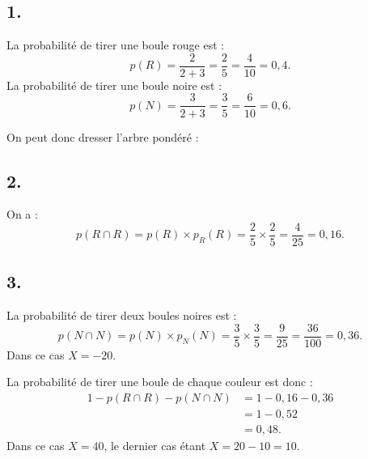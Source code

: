 \subsection*{1.}

La probabilité de tirer une boule rouge est :
\[
p(R) = \dfrac{2}{2+3} = \dfrac{2}{5} = \dfrac{4}{10} = 0{,}4.
\]
La probabilité de tirer une boule noire est :
\[
p(N) = \dfrac{3}{2+3} = \dfrac{3}{5} = \dfrac{6}{10} = 0{,}6.
\]

On peut donc dresser l’arbre pondéré :
\begin{center}
\end{center}

\subsection*{2.}

On a :
\[
p(R \cap R) = p(R) \times p_R(R) = \dfrac{2}{5} \times \dfrac{2}{5} = \dfrac{4}{25} = 0{,}16.
\]

\subsection*{3.}

La probabilité de tirer deux boules noires est :
\[
p(N \cap N) = p(N) \times p_N(N) = \dfrac{3}{5} \times \dfrac{3}{5} = \dfrac{9}{25} = \dfrac{36}{100} = 0{,}36.
\]
Dans ce cas \(X = -20\).

La probabilité de tirer une boule de chaque couleur est donc :
\begin{align*}
1 - p(R \cap R) - p(N \cap N) &= 1 - 0{,}16 - 0{,}36 \\
&= 1 - 0{,}52 \\
&= 0{,}48.
\end{align*}
Dans ce cas \(X = 40\), le dernier cas étant \(X = 20 - 10 = 10\).

